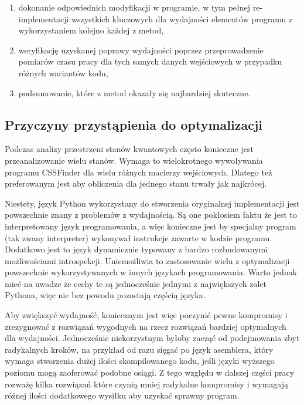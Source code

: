\documentclass[11pt, a4paper]{article}
\begin{document}
\begin{sloppypar}
\begin{enumerate}
      \item dokonanie odpowiednich modyfikacji w programie, w tym pełnej re-implementacji
        wszystkich kluczowych dla wydajności elementów programu z wykorzystaniem kolejno
        każdej z metod,

      \item weryfikację uzyskanej poprawy wydajności poprzez przeprowadzenie pomiarów czasu
        pracy dla tych samych danych wejściowych w przypadku różnych wariantów kodu,

      \item podsumowanie, które z metod okazały się najbardziej skuteczne.
    \end{enumerate}

    \subsection{Przyczyny przystąpienia do optymalizacji}
    Podczas analizy przestrzeni stanów kwantowych często konieczne jest przeanalizowanie
    wielu stanów. Wymaga to wielokrotnego wywoływania programu CSSFinder dla wielu różnych
    macierzy wejściowych. Dlatego też preferowanym jest aby obliczenia dla jednego stanu
    trwały jak najkrócej.

    Niestety, język Python wykorzystany do stworzenia oryginalnej implementacji jest powszechnie
    znany z problemów z wydajnością\cite{srinath2017python}. Są one pokłosiem faktu że jest
    to interpretowany język programowania, a więc konieczne jest by specjalny program (tak
    zwany interpreter) wykonywał instrukcje zawarte w kodzie programu. Dodatkowo jest to
    język dynamicznie typowany z bardzo rozbudowanymi możliwościami introspekcji.
    Uniemożliwia to zastosowanie wielu z optymalizacji powszechnie wykorzystywanych w
    innych językach programowania. Warto jednak mieć na uwadze że cechy te są jednocześnie
    jednymi z największych zalet Pythona, więc nie bez powodu pozostają częścią języka.

    Aby zwiększyć wydajność, koniecznym jest więc poczynić pewne kompromisy i zrezygnować
    z rozwiązań wygodnych na rzecz rozwiązań bardziej optymalnych dla wydajności.
    Jednocześnie niekorzystnym byłoby zacząć od podejmowania zbyt radykalnych kroków, na
    przykład od razu sięgać po język asemblera, który wymaga stworzenia dużej ilości
    skompilowanego kodu, jeśli języki wyższego poziomu mogą zaoferować podobne osiągi. Z
    tego względu w dalszej części pracy rozważę kilka rozwiązań które czynią mniej
    radykalne kompromisy i wymagają różnej ilości dodatkowego wysiłku aby uzyskać
    sprawny program.


\end{sloppypar}
\end{document}
